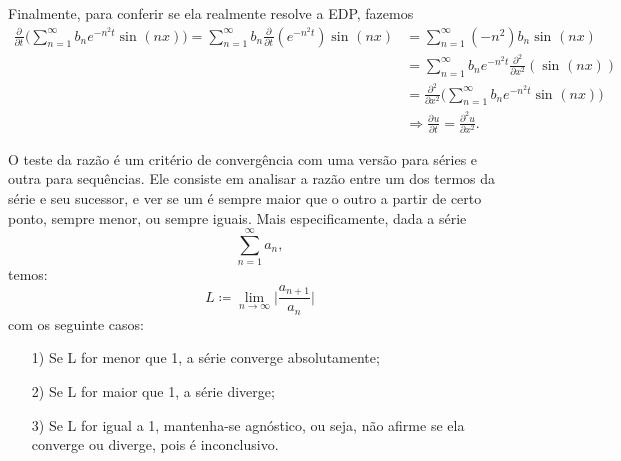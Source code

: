 \documentclass[../pde_notes.tex]{subfiles}
\begin{document}
Finalmente, para conferir se ela realmente resolve a EDP, fazemos
\begin{align*}
	\frac{\partial^{}}{\partial t^{}}\biggl(\sum\limits_{n=1}^{\infty}b_{n}e^{-n^{2}t}\sin^{}{(nx)}\biggr) = \sum\limits_{n=1}^{\infty}b_{n}\frac{\partial^{}}{\partial t^{}}(e^{-n^{2}t})\sin^{}{(nx)} & = \sum\limits_{n=1}^{\infty}(-n^{2})b_{n}\sin^{}{(nx)}                                                      \\
	                                                                                                                                                                                                    & =\sum\limits_{n=1}^{\infty}b_{n}e^{-n^{2}t}\frac{\partial^{2}}{\partial x^{2}}(\sin^{}{(nx)})               \\
	                                                                                                                                                                                                    & = \frac{\partial^{2}}{\partial x^{2}} \biggl(\sum\limits_{n=1}^{\infty}b_{n}e^{-n^{2}t}\sin^{}{(nx)}\biggr) \\
	                                                                                                                                                                                                    & \Rightarrow \frac{\partial^{}u}{\partial t^{}} = \frac{\partial^{2}u}{\partial x^{2}}.
\end{align*}

\begin{tcolorbox}[
		skin=enhanced,
		title=Lembrete!,
		after title={\hfill Teste da Razão},
		fonttitle=\bfseries,
		sharp corners=downhill,
		colframe=black,
		colbacktitle=yellow!75!white,
		colback=yellow!30,
		colbacklower=black,
		coltitle=black,
		drop large lifted shadow
	]
	O teste da razão é um critério de convergência com uma versão para séries e outra para sequências. Ele consiste em analisar a razão entre um dos termos da série e seu sucessor, e ver se um é sempre maior que o outro a partir de certo ponto, sempre menor, ou sempre iguais. Mais especificamente, dada a série
	\[
		\sum\limits_{n=1}^{\infty}a_{n},
	\]
	temos:
	\[
		L\coloneqq \lim_{n\to \infty}\biggl\vert \frac{a_{n+1}}{a_{n}} \biggr\vert
	\]
	com os seguinte casos:
	\begin{itemize}
		\item[1)] Se L for menor que 1, a série converge absolutamente;
		\item[2)] Se L for maior que 1, a série diverge;
		\item[3)] Se L for igual a 1, mantenha-se agnóstico, ou seja, não afirme se ela converge ou diverge, pois é inconclusivo.
	\end{itemize}
\end{tcolorbox}
\end{document}
